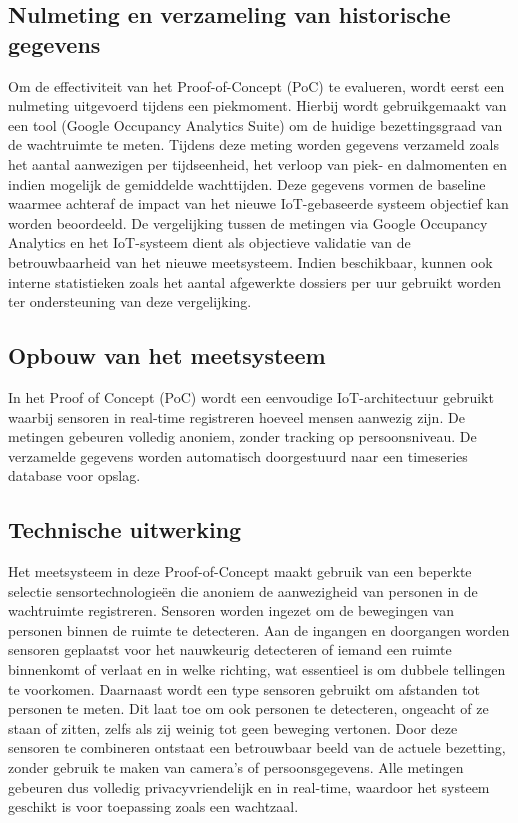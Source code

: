 \subsection{Nulmeting en verzameling van historische gegevens}
Om de effectiviteit van het Proof-of-Concept (PoC) te evalueren, wordt eerst een nulmeting uitgevoerd tijdens een piekmoment. Hierbij wordt gebruikgemaakt van een tool (Google Occupancy Analytics Suite) om de huidige bezettingsgraad van de wachtruimte te meten. Tijdens deze meting worden gegevens verzameld zoals het aantal aanwezigen per tijdseenheid, het verloop van piek- en dalmomenten en indien mogelijk de gemiddelde wachttijden. Deze gegevens vormen de baseline waarmee achteraf de impact van het nieuwe IoT-gebaseerde systeem objectief kan worden beoordeeld. De vergelijking tussen de metingen via Google Occupancy Analytics en het IoT-systeem dient als objectieve validatie van de betrouwbaarheid van het nieuwe meetsysteem. Indien beschikbaar, kunnen ook interne statistieken zoals het aantal afgewerkte dossiers per uur gebruikt worden ter ondersteuning van deze vergelijking.

\subsection{Opbouw van het meetsysteem}
In het Proof of Concept (PoC) wordt een eenvoudige IoT-architectuur gebruikt waarbij sensoren in real-time registreren hoeveel mensen aanwezig zijn. De metingen gebeuren volledig anoniem, zonder tracking op persoonsniveau. De verzamelde gegevens worden automatisch doorgestuurd naar een timeseries database voor opslag. 

\subsection{Technische uitwerking}
Het meetsysteem in deze Proof-of-Concept maakt gebruik van een beperkte selectie sensortechnologieën die anoniem de aanwezigheid van personen in de wachtruimte registreren. Sensoren worden ingezet om de bewegingen van personen binnen de ruimte te detecteren. Aan de ingangen en doorgangen worden sensoren geplaatst voor het nauwkeurig detecteren of iemand een ruimte binnenkomt of verlaat en in welke richting, wat essentieel is om dubbele tellingen te voorkomen. Daarnaast wordt een type sensoren gebruikt om afstanden tot personen te meten. Dit laat toe om ook personen te detecteren, ongeacht of ze staan of zitten, zelfs als zij weinig tot geen beweging vertonen. Door deze sensoren te combineren ontstaat een betrouwbaar beeld van de actuele bezetting, zonder gebruik te maken van camera’s of persoonsgegevens. Alle metingen gebeuren dus volledig privacyvriendelijk en in real-time, waardoor het systeem geschikt is voor toepassing zoals een wachtzaal. 


